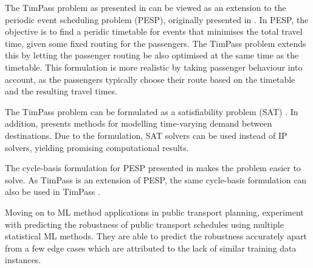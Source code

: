 \documentclass[english, 12pt, a4paper, sci, utf8, a-2b, online]{aaltothesis}
\begin{document}




The TimPass problem as presented in \cite{timpass-original-2014} can be viewed as an extension to the periodic event scheduling problem (PESP), originally presented in \cite{pesp-original-1989}. In PESP, the objective is to find a peridic timetable for events that minimises the total travel time, given some fixed routing for the passengers. The TimPass problem extends this by letting the passenger routing be also optimised at the same time as the timetable. This formulation is more realistic by taking passenger behaviour into account, as the passengers typically choose their route based on the timetable and the resulting travel times.



The TimPass problem can be formulated as a satisfiability problem (SAT) \cite{sat-philine-gattermann2016integrating}. In addition, \cite{sat-philine-gattermann2016integrating} presents methods for modelling time-varying demand between destinations. Due to the formulation, SAT solvers can be used instead of IP solvers, yielding promising computational results.

The cycle-basis formulation for PESP presented in \cite{cycle-basis-original-2001} makes the problem easier to solve. As TimPass is an extension of PESP, the same cycle-basis formulation can also be used in TimPass \cite{schiewe2020periodic}.



Moving on to ML method applications in public transport planning, \cite{MULLERHANNEMANN2022103566} experiment with predicting the robustness of public transport schedules using multiple statistical ML methods. They are able to predict the robustness accurately apart from a few edge cases which are attributed to the lack of similar training data instances.
\end{document}

